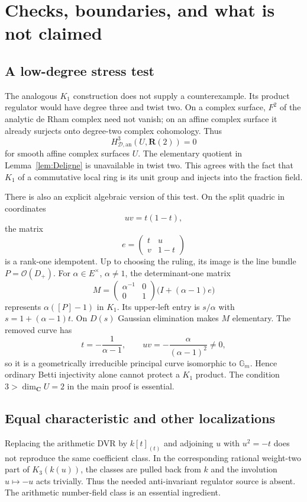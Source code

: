 \documentclass[11pt,a4paper]{article}
\theoremstyle{remark}
\newcommand{\R}{\mathbf R}
\newcommand{\C}{\mathbf C}
\newcommand{\OO}{\mathcal O}
\newcommand{\HD}{H_{\mathcal D,\mathrm{an}}}
\begin{document}
\section{Checks, boundaries, and what is not claimed}

\subsection{A low-degree stress test}
The analogous $K_1$ construction does not supply a counterexample. Its product regulator would have degree three and twist two. On a complex surface, $F^2$ of the analytic de Rham complex need not vanish; on an affine complex surface it already surjects onto degree-two complex cohomology. Thus
\[
\HD^3(U,\R(2))=0
\]
for smooth affine complex surfaces $U$. The elementary quotient in Lemma~\ref{lem:Deligne} is unavailable in twist two. This agrees with the fact that $K_1$ of a commutative local ring is its unit group and injects into the fraction field.

There is also an explicit algebraic version of this test. On the split quadric in coordinates
\[
uv=t(1-t),
\]
the matrix
\[
e=\begin{pmatrix}t&u\\v&1-t\end{pmatrix}
\]
is a rank-one idempotent. Up to choosing the ruling, its image is the line bundle $P=\OO(D_+)$. For $\alpha\in E^\times$, $\alpha\neq1$, the determinant-one matrix
\[
M=\begin{pmatrix}\alpha^{-1}&0\\0&1\end{pmatrix}
\bigl(I+(\alpha-1)e\bigr)
\]
represents $\alpha([P]-1)$ in $K_1$. Its upper-left entry is $s/\alpha$ with $s=1+(\alpha-1)t$. On $D(s)$ Gaussian elimination makes $M$ elementary. The removed curve has
\[
t=-\frac1{\alpha-1},\qquad uv=-\frac{\alpha}{(\alpha-1)^2}\neq0,
\]
so it is a geometrically irreducible principal curve isomorphic to $\mathbb G_m$. Hence ordinary Betti injectivity alone cannot protect a $K_1$ product. The condition $3>\dim_{\C}U=2$ in the main proof is essential.

\subsection{Equal characteristic and other localizations}
Replacing the arithmetic DVR by $k[t]_{(t)}$ and adjoining $u$ with $u^2=-t$ does not reproduce the same coefficient class. In the corresponding rational weight-two part of $K_3(k(u))$, the classes are pulled back from $k$ and the involution $u\mapsto -u$ acts trivially. Thus the needed anti-invariant regulator source is absent. The arithmetic number-field class is an essential ingredient.
\end{document}
